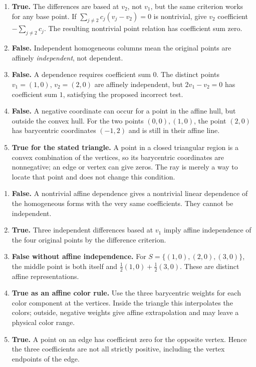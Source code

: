 \begin{enumerate}[label=(\alph*)]
\item \textbf{True.} The differences are based at $v_2$, not $v_1$, but the same criterion works for any base point. If $\sum_{j\ne2}c_j(v_j-v_2)=0$ is nontrivial, give $v_2$ coefficient $-\sum_{j\ne2}c_j$. The resulting nontrivial point relation has coefficient sum zero.
\item \textbf{False.} Independent homogeneous columns mean the original points are affinely \emph{independent}, not dependent.
\item \textbf{False.} A dependence requires coefficient sum $0$. The distinct points $v_1=(1,0)$, $v_2=(2,0)$ are affinely independent, but $2v_1-v_2=0$ has coefficient sum $1$, satisfying the proposed incorrect test.
\item \textbf{False.} A negative coordinate can occur for a point in the affine hull, but outside the convex hull. For the two points $(0,0),(1,0)$, the point $(2,0)$ has barycentric coordinates $(-1,2)$ and is still in their affine line.
\item \textbf{True for the stated triangle.} A point in a closed triangular region is a convex combination of the vertices, so its barycentric coordinates are nonnegative; an edge or vertex can give zeros. The ray is merely a way to locate that point and does not change this condition.
\end{enumerate}

\begin{enumerate}[label=(\alph*)]
\item \textbf{False.} A nontrivial affine dependence gives a nontrivial linear dependence of the homogeneous forms with the very same coefficients. They cannot be independent.
\item \textbf{True.} Three independent differences based at $v_1$ imply affine independence of the four original points by the difference criterion.
\item \textbf{False without affine independence.} For $S=\{(1,0),(2,0),(3,0)\}$, the middle point is both itself and $\tfrac12(1,0)+\tfrac12(3,0)$. These are distinct affine representations.
\item \textbf{True as an affine color rule.} Use the three barycentric weights for each color component at the vertices. Inside the triangle this interpolates the colors; outside, negative weights give affine extrapolation and may leave a physical color range.
\item \textbf{True.} A point on an edge has coefficient zero for the opposite vertex. Hence the three coefficients are not all strictly positive, including the vertex endpoints of the edge.
\end{enumerate}

